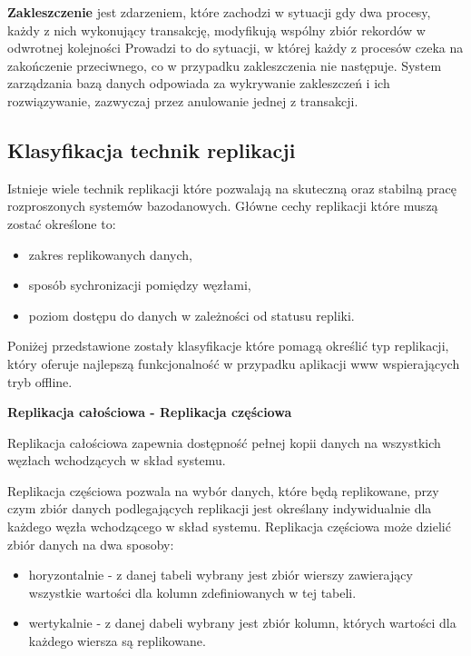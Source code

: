 \textbf{Zakleszczenie} jest zdarzeniem, które zachodzi w sytuacji gdy dwa procesy, każdy z nich wykonujący transakcję, modyfikują wspólny zbiór rekordów w odwrotnej kolejności Prowadzi to do sytuacji, w której każdy z procesów czeka na zakończenie przeciwnego, co w przypadku zakleszczenia nie następuje. System zarządzania bazą danych odpowiada za wykrywanie zakleszczeń i ich rozwiązywanie, zazwyczaj przez anulowanie jednej z transakcji.

\subsection{Klasyfikacja technik replikacji}
\label{sec:klasTechReplik}

Istnieje wiele technik replikacji które pozwalają na skuteczną oraz stabilną pracę rozproszonych systemów bazodanowych. Główne cechy replikacji które muszą zostać określone to:

\begin{itemize}
\item zakres replikowanych danych,
\item sposób sychronizacji pomiędzy węzłami,
\item poziom dostępu do danych w zależności od statusu repliki.
\end{itemize}

Poniżej przedstawione zostały klasyfikacje które pomagą określić typ replikacji, który oferuje najlepszą funkcjonalność w przypadku aplikacji www wspierających tryb offline.

\setlength{\parskip}{10pt plus 1pt minus 1pt}
\textbf{Replikacja całościowa - Replikacja częściowa}
\setlength{\parskip}{10pt plus 1pt minus 1pt}

Replikacja całościowa zapewnia dostępność pełnej kopii danych na wszystkich węzłach wchodzących w skład systemu.

Replikacja częściowa pozwala na wybór danych, które będą replikowane, przy czym zbiór danych podlegających replikacji jest określany indywidualnie dla każdego węzła wchodzącego w skład systemu. Replikacja częściowa może dzielić zbiór danych na dwa sposoby:

\begin{itemize}
\item horyzontalnie - z danej tabeli wybrany jest zbiór wierszy zawierający wszystkie wartości dla kolumn zdefiniowanych w tej tabeli.
\item wertykalnie - z danej dabeli wybrany jest zbiór kolumn, których wartości dla każdego wiersza są replikowane.
\end{itemize}

